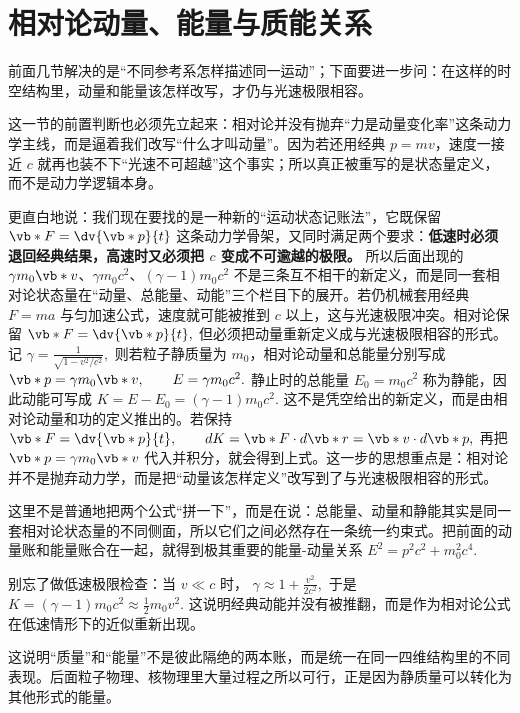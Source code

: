 \documentclass[lang=cn,11pt]{elegantbook}
\newcommand{\bridge}[1]{\begin{note}#1\end{note}}
\begin{document}
\section{相对论动量、能量与质能关系}

前面几节解决的是“不同参考系怎样描述同一运动”；下面要进一步问：在这样的时空结构里，动量和能量该怎样改写，才仍与光速极限相容。

这一节的前置判断也必须先立起来：相对论并没有抛弃“力是动量变化率”这条动力学主线，而是逼着我们改写“什么才叫动量”。因为若还用经典 \(p=mv\)，速度一接近 \(c\) 就再也装不下“光速不可超越”这个事实；所以真正被重写的是状态量定义，而不是动力学逻辑本身。

更直白地说：我们现在要找的是一种新的“运动状态记账法”，它既保留
 \(\vb*{F}=\dv{\vb*{p}}{t}\) 
这条动力学骨架，又同时满足两个要求：\textbf{低速时必须退回经典结果，高速时又必须把 \(c\) 变成不可逾越的极限。} 所以后面出现的 \(\gamma m_0\vb*{v}\)、\(\gamma m_0c^2\)、\((\gamma-1)m_0c^2\) 不是三条互不相干的新定义，而是同一套相对论状态量在“动量、总能量、动能”三个栏目下的展开。若仍机械套用经典 \(F=ma\) 与匀加速公式，速度就可能被推到 \(c\) 以上，这与光速极限冲突。相对论保留
 \(\vb*{F}=\dv{\vb*{p}}{t},\) 
但必须把动量重新定义成与光速极限相容的形式。记
 \(\gamma=\frac{1}{\sqrt{1-v^2/c^2}},\) 
则若粒子静质量为 \(m_0\)，相对论动量和总能量分别写成
 \(\vb*{p}=\gamma m_0 \vb*{v}, \qquad E=\gamma m_0 c^2.\) 
静止时的总能量
 \(E_0=m_0c^2\) 
称为静能，因此动能可写成
 \(K=E-E_0=(\gamma-1)m_0c^2.\) 
这不是凭空给出的新定义，而是由相对论动量和功的定义推出的。若保持
 \(\vb*{F}=\dv{\vb*{p}}{t}, \qquad dK=\vb*{F}\cdot d\vb*{r}=\vb*{v}\cdot d\vb*{p},\) 
再把 \(\vb*{p}=\gamma m_0\vb*{v}\) 代入并积分，就会得到上式。这一步的思想重点是：相对论并不是抛弃动力学，而是把“动量该怎样定义”改写到了与光速极限相容的形式。

这里不是普通地把两个公式“拼一下”，而是在说：总能量、动量和静能其实是同一套相对论状态量的不同侧面，所以它们之间必然存在一条统一约束式。把前面的动量账和能量账合在一起，就得到极其重要的能量-动量关系
 \(E^2=p^2c^2+m_0^2c^4.\) 

\begin{remark}
别忘了做低速极限检查：当 \(v\ll c\) 时，
 \(\gamma\approx 1+\frac{v^2}{2c^2},\) 
于是
 \(K=(\gamma-1)m_0c^2\approx \frac12 m_0v^2.\) 
这说明经典动能并没有被推翻，而是作为相对论公式在低速情形下的近似重新出现。
\end{remark}

\bridge{这说明“质量”和“能量”不是彼此隔绝的两本账，而是统一在同一四维结构里的不同表现。后面粒子物理、核物理里大量过程之所以可行，正是因为静质量可以转化为其他形式的能量。}
\end{document}
